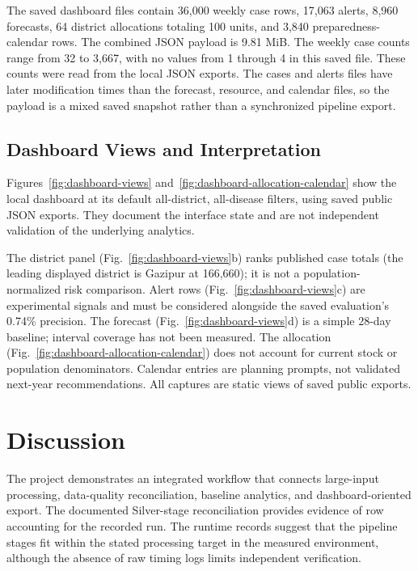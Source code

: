 ﻿\documentclass[conference]{IEEEtran}
\begin{document}
The saved dashboard files contain 36,000 weekly case rows, 17,063 alerts, 8,960 forecasts, 64 district allocations totaling 100 units, and 3,840 preparedness-calendar rows. The combined JSON payload is 9.81 MiB. The weekly case counts range from 32 to 3,667, with no values from 1 through 4 in this saved file. These counts were read from the local JSON exports. The cases and alerts files have later modification times than the forecast, resource, and calendar files, so the payload is a mixed saved snapshot rather than a synchronized pipeline export.

\subsection{Dashboard Views and Interpretation}
Figures~\ref{fig:dashboard-views} and~\ref{fig:dashboard-allocation-calendar} show the local dashboard at its default all-district, all-disease filters, using saved public JSON exports. They document the interface state and are not independent validation of the underlying analytics.

The district panel (Fig.~\ref{fig:dashboard-views}b) ranks published case totals (the leading displayed district is Gazipur at 166,660); it is not a population-normalized risk comparison. Alert rows (Fig.~\ref{fig:dashboard-views}c) are experimental signals and must be considered alongside the saved evaluation's 0.74\% precision. The forecast (Fig.~\ref{fig:dashboard-views}d) is a simple 28-day baseline; interval coverage has not been measured. The allocation (Fig.~\ref{fig:dashboard-allocation-calendar}) does not account for current stock or population denominators. Calendar entries are planning prompts, not validated next-year recommendations. All captures are static views of saved public exports.

\FloatBarrier

\section{Discussion}

The project demonstrates an integrated workflow that connects large-input processing, data-quality reconciliation, baseline analytics, and dashboard-oriented export. The documented Silver-stage reconciliation provides evidence of row accounting for the recorded run. The runtime records suggest that the pipeline stages fit within the stated processing target in the measured environment, although the absence of raw timing logs limits independent verification.
\end{document}
